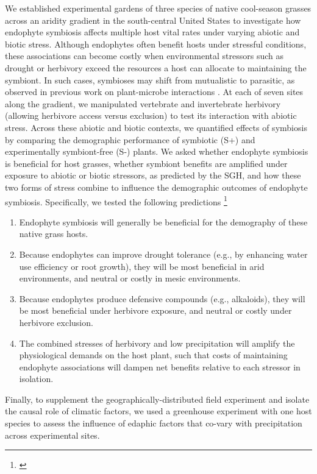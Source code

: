 \documentclass[12pt]{article}\usepackage[]{graphicx}\usepackage[dvipsnames]{xcolor}
\newcommand{\tom}[2]{{\color{red}{#1}}\footnote{\textit{\color{red}{#2}}}}
\begin{document}
We established experimental gardens of three species of native cool-season grasses across an aridity gradient in the south-central United States to investigate how endophyte symbiosis affects multiple host vital rates under varying abiotic and biotic stress. 
Although endophytes often benefit hosts under stressful conditions, these associations can become costly when environmental stressors such as drought or herbivory exceed the resources a host can allocate to maintaining the symbiont. 
In such cases, symbioses may shift from mutualistic to parasitic, as observed in previous work on plant-microbe interactions \citep{johnson1997functioning}.
At each of seven sites along the gradient, we manipulated vertebrate and invertebrate herbivory (allowing herbivore access versus exclusion) to test its interaction with abiotic stress.
Across these abiotic and biotic contexts, we quantified effects of symbiosis by comparing the demographic performance of symbiotic (S+) and experimentally symbiont-free (S-) plants. 
We asked whether endophyte symbiosis is beneficial for host grasses, whether symbiont benefits are amplified under exposure to abiotic or biotic stressors, as predicted by the SGH, and how these two forms of stress combine to influence the demographic outcomes of endophyte symbiosis.
Specifically, we tested the following predictions \tom{(Fig.~\ref{fig:prediction}): }{Figure comments: the y axis is labeled `endophyte effect on host fitness', but it's not the effect you are showing, it's host fitness. Can you make the "X" over the deer larger in panel A?}
\begin{enumerate}
	\item Endophyte symbiosis will generally be beneficial for the demography of these native grass hosts.
	\item Because endophytes can improve drought tolerance (e.g., by enhancing water use efficiency or root growth), they will be most beneficial in arid environments, and neutral or costly in mesic environments.
	\item Because endophytes produce defensive compounds (e.g., alkaloids), they will be most beneficial under herbivore exposure, and neutral or costly under herbivore exclusion.
	\item The combined stresses of herbivory and low precipitation will amplify the physiological demands on the host plant, such that costs of maintaining endophyte associations will dampen net benefits relative to each stressor in isolation.
\end{enumerate}
Finally, to supplement the geographically-distributed field experiment and isolate the causal role of climatic factors, we used a greenhouse experiment with one host species to assess the influence of edaphic factors that co-vary with precipitation across experimental sites. 
\end{document}
